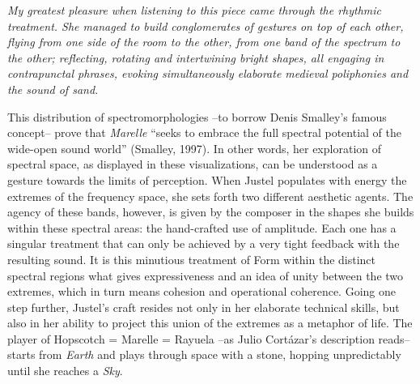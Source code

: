 \documentclass{article}
\begin{document}
\bigskip
\begin{flushright}
\textit{My greatest pleasure when listening to this piece came through the rhythmic treatment. She managed to build conglomerates of gestures on top of each other, flying from one side of the room to the other, from one band of the spectrum to the other; reflecting, rotating and intertwining bright shapes, all  engaging in contrapunctal phrases, evoking simultaneously elaborate medieval poliphonies and the sound of sand.}
\end{flushright}
\newpage

This distribution of spectromorphologies --to borrow Denis Smalley's famous concept-- prove that \textit{Marelle} ``seeks to embrace the full spectral potential of the wide-open sound world'' (Smalley, 1997). In other words, her exploration of spectral space, as displayed in these visualizations, can be understood as a gesture towards the limits of perception. When Justel populates with energy the extremes of the frequency space, she sets forth two different aesthetic agents. The agency of these bands, however, is given by the composer in the shapes she builds within these spectral areas: the hand-crafted use of amplitude. Each one has a singular treatment that can only be achieved by a very tight feedback with the resulting sound. It is this minutious treatment of Form within the distinct spectral regions what gives expressiveness and an idea of unity between the two extremes, which in turn means cohesion and operational coherence. Going one step further, Justel's craft resides not only in her elaborate technical skills, but also in her ability to project this union of the extremes as a metaphor of life. The player of Hopscotch = Marelle = Rayuela --as Julio Cort\'{a}zar's description reads-- starts from \emph{Earth} and plays through space with a stone, hopping unpredictably until she reaches a \emph{Sky}.

\bigskip
\end{document}
